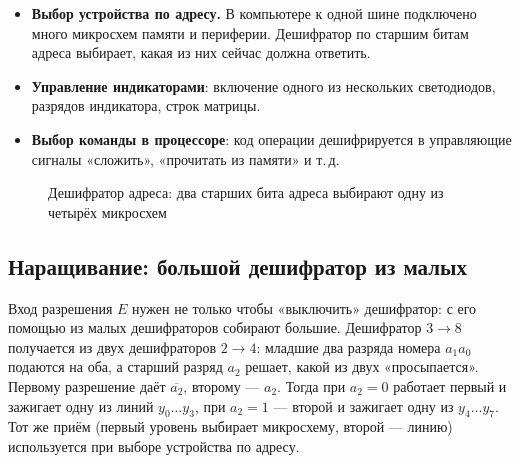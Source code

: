 \begin{itemize}
  \item \textbf{Выбор устройства по адресу.} В компьютере к одной шине
        подключено много микросхем памяти и периферии. Дешифратор по
        старшим битам адреса выбирает, какая из них сейчас должна ответить.
  \item \textbf{Управление индикаторами}: включение одного из нескольких
        светодиодов, разрядов индикатора, строк матрицы.
  \item \textbf{Выбор команды в процессоре}: код операции дешифрируется в
        управляющие сигналы «сложить», «прочитать из памяти» и т.\,д.
\end{itemize}

\begin{figure}[H]
\centering
{}
\caption{Дешифратор адреса: два старших бита адреса выбирают одну из четырёх микросхем}
\end{figure}

\subsection{Наращивание: большой дешифратор из малых}

Вход разрешения $E$ нужен не только чтобы «выключить» дешифратор: с его помощью
из малых дешифраторов собирают большие. Дешифратор $3\to8$ получается из
двух дешифраторов $2\to4$: младшие два разряда номера $a_1a_0$ подаются на
оба, а старший разряд $a_2$ решает, какой из двух «просыпается». Первому
разрешение даёт $\overline{a_2}$, второму --- $a_2$. Тогда при $a_2=0$ работает
первый и зажигает одну из линий $y_0\ldots y_3$, при $a_2=1$ --- второй и
зажигает одну из $y_4\ldots y_7$. Тот же приём (первый уровень выбирает
микросхему, второй --- линию) используется при выборе устройства по адресу.

